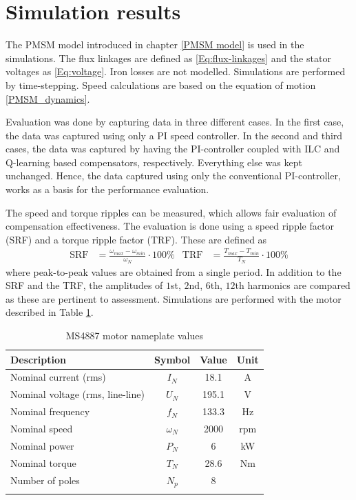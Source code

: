 \section{Simulation results}
The PMSM model introduced in chapter \ref{PMSM model} is used in the simulations. The flux linkages are defined as \eqref{Eq:flux-linkages} and the stator voltages as \eqref{Eq:voltage}. Iron losses are not modelled. Simulations are performed by time-stepping. Speed calculations are based on the equation of motion \eqref{PMSM_dynamics}.

Evaluation was done by capturing data in three different cases. In the first case, the data was captured using only a PI speed controller. In the second and third cases, the data was captured by having the PI-controller coupled with ILC and Q-learning based compensators, respectively. Everything else was kept unchanged. Hence, the data captured using only the conventional PI-controller, works as a basis for the performance evaluation.

The speed and torque ripples can be measured, which allows fair evaluation of compensation effectiveness. The evaluation is done using a speed ripple factor (SRF) and a torque ripple factor (TRF). These are defined as \cite{ILC:2005}
\begin{align}
    \text{SRF} &= \frac{\omega_{max} - \omega_{min}}{\omega_N} \cdot 100\% & \text{TRF} &= \frac{T_{max} - T_{min}}{T_N} \cdot 100\%
    \label{eq:ripple-factor}
\end{align} 
where peak-to-peak values are obtained from a single period. In addition to the SRF and the TRF, the amplitudes of $1$st, $2$nd, $6$th, $12$th harmonics are compared as these are pertinent to assessment. Simulations are performed with the motor described in Table \ref{Tbl:MS4887}.

\begin{table}[ht]
\caption{MS4887 motor nameplate values}
\centering
\begin{tabular}[t]{lccc}
\hline
Description & Symbol & Value  & Unit\\
\hline
Nominal current (rms) & $I_N$ & 18.1  & A\\
Nominal voltage (rms, line-line)  & $U_N$  & 195.1 & V\\
Nominal frequency & $f_N$      & 133.3 & Hz\\
Nominal speed     & $\omega_N$ & 2000  & rpm\\
Nominal power     & $P_N$      & 6     & kW\\
Nominal torque    & $T_N$      & 28.6  & Nm\\
Number of poles   & $N_p$      & 8     & \\
\hline
\label{Tbl:MS4887}
\end{tabular}
\end{table}%



